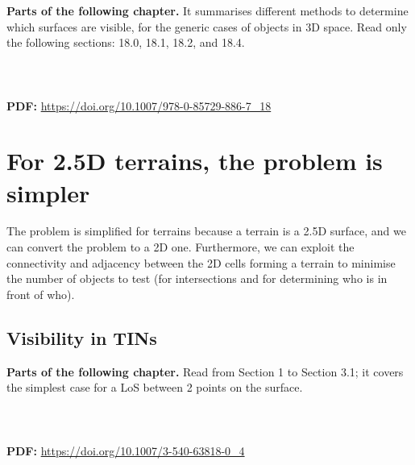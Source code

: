 
\begin{floatbox}
  \begin{kaobox-toread}[frametitle=\faExternalLink\ To read or to watch]
    \textbf{Parts of the following chapter.} It summarises different methods to determine which surfaces are visible, for the generic cases of objects in 3D space.
    Read only the following sections: 18.0, 18.1, 18.2, and 18.4.
    \\ \\
     \\ \\
    \textbf{PDF:} \url{https://doi.org/10.1007/978-0-85729-886-7_18}
  \end{kaobox-toread}
\end{floatbox}




%
\section[2.5D terrains are simple]{For 2.5D terrains, the problem is simpler}

The problem is simplified for terrains because a terrain is a 2.5D surface, and we can convert the problem to a 2D one.
Furthermore, we can exploit the connectivity and adjacency between the 2D cells forming a terrain to minimise the number of objects to test (for intersections and for determining who is in front of who).


%
\subsection{Visibility in TINs}

\begin{floatbox}
  \begin{kaobox-toread}[frametitle=\faExternalLink\ To read or to watch]
  \textbf{Parts of the following chapter.} 
  Read from Section 1 to Section 3.1; it covers the simplest case for a LoS between 2 points on the surface.
  \\ \\
   \\ \\
  \textbf{PDF:} \url{https://doi.org/10.1007/3-540-63818-0_4}
  \end{kaobox-toread}
\end{floatbox}


